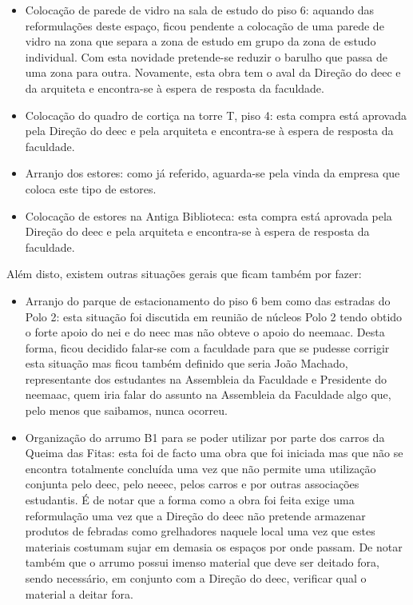 \begin{itemize}
\item Colocação de parede de vidro na sala de estudo do piso 6: aquando das reformulações deste espaço, ficou pendente a colocação de uma parede de vidro na zona que separa a zona de estudo em grupo da zona de estudo individual. Com esta novidade pretende-se reduzir o barulho que passa de uma zona para outra. Novamente, esta obra tem o aval da Direção do \acrshort{deec} e da arquiteta e encontra-se à espera de resposta da faculdade.
\item Colocação do quadro de cortiça na torre T, piso 4: esta compra está aprovada pela Direção do \acrshort{deec} e pela arquiteta e encontra-se à espera de resposta da faculdade.
\item Arranjo dos estores: como já referido, aguarda-se pela vinda da empresa que coloca este tipo de estores.
\item Colocação de estores na Antiga Biblioteca: esta compra está aprovada pela Direção do \acrshort{deec} e pela arquiteta e encontra-se à espera de resposta da faculdade.
\end{itemize}

Além disto, existem outras situações gerais que ficam também por fazer:
\begin{itemize}
\item Arranjo do parque de estacionamento do piso 6 bem como das estradas do Polo 2: esta situação foi discutida em reunião de núcleos Polo 2 tendo obtido o forte apoio do \acrshort{nei} e do \acrshort{neec} mas não obteve o apoio do \acrshort{neemaac}. Desta forma, ficou decidido falar-se com a faculdade para que se pudesse corrigir esta situação mas ficou também definido que seria João Machado, representante dos estudantes na Assembleia da Faculdade e Presidente do \acrshort{neemaac}, quem iria falar do assunto na Assembleia da Faculdade algo que, pelo menos que saibamos, nunca ocorreu.
\item Organização do arrumo B1 para se poder utilizar por parte dos carros da Queima das Fitas: esta foi de facto uma obra que foi iniciada mas que não se encontra totalmente concluída uma vez que não permite uma utilização conjunta pelo \acrshort{deec}, pelo \acrshort{neeec}, pelos carros e por outras associações estudantis. É de notar que a forma como a obra foi feita exige uma reformulação uma vez que a Direção do \acrshort{deec} não pretende armazenar produtos de febradas como grelhadores naquele local uma vez que estes materiais costumam sujar em demasia os espaços por onde passam. De notar também que o arrumo possui imenso material que deve ser deitado fora, sendo necessário, em conjunto com a Direção do \acrshort{deec}, verificar qual o material a deitar fora.
\end{itemize}